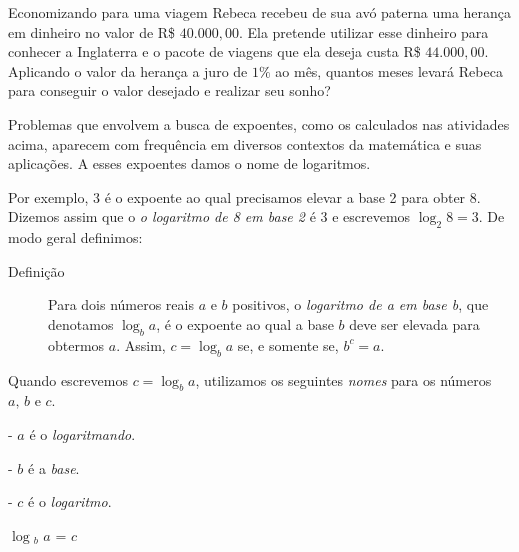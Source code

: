 

\begin{task}{Economizando para uma viagem}
Rebeca recebeu de sua avó paterna uma herança em dinheiro no valor de R\$ $40.000{,}00$. Ela pretende utilizar esse dinheiro para conhecer a Inglaterra e o pacote de viagens que ela deseja custa R\$ $44.000{,}00$. Aplicando o valor da herança a juro de $1\%$ ao mês, quantos meses levará Rebeca para conseguir o valor desejado e realizar seu sonho?
\end{task}

\label{organizando-as-ideias-logaritmos}

Problemas que envolvem a busca de expoentes, como os calculados nas atividades acima, aparecem com frequência em diversos contextos da matemática e suas aplicações. A esses expoentes damos o nome de logaritmos.


Por exemplo, 3 é o expoente ao qual precisamos elevar a base 2 para obter 8. Dizemos assim que o \textit{o logaritmo de 8 em base 2} é 3 e escrevemos $\log_2 8 = 3$. De modo geral definimos:


\begin{description}
\item[Definição]
Para dois números reais $a$ e $b$ positivos, o \textit{logaritmo de a em base b}, que denotamos $\log_b a$, é o expoente ao qual a base $b$ deve ser elevada para obtermos $a$. Assim, $c=\log_b a$ se, e somente se, $b^c=a$.
\end{description}

\begin{observation}{}
Quando escrevemos $c = \log_b a$, utilizamos os seguintes \textit{nomes} para os números $a,\,b$ e $c$.
\begin{center}
\begin{minipage}{0.3\linewidth}
\begin{flushleft}
- \textcolor{penlaranja}{$a$} é o \textcolor{penlaranja}{\textit{logaritmando}}.

- \textcolor{penaqua}{$b$} é a \textcolor{penaqua}{\textit{base}}.

- \textcolor{penazul}{$c$} é o \textcolor{penazul}{\textit{logaritmo}}.

\end{flushleft}
\end{minipage}
\begin{minipage}{0.3\linewidth}

\Huge $\log$\textcolor{penaqua}{$_b$} \textcolor{penlaranja}{$a$} = \textcolor{penazul}{$c$}

\end{minipage}
\end{center}
\end{observation}


